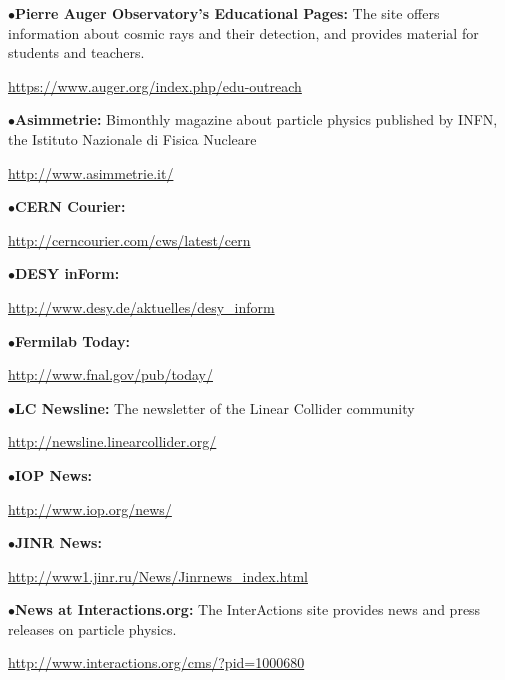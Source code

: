 \smallskip

\item{$\bullet$}{\bf Pierre Auger Observatory's Educational Pages:}
The site offers information about cosmic rays and their detection, and provides material for students and teachers.
     \item{}\qquad\url{https://www.auger.org/index.php/edu-outreach}

\medskip
\medskip



\medskip


\item{$\bullet$}{\bf Asimmetrie:}
Bimonthly magazine about particle physics published by INFN, the Istituto Nazionale di Fisica Nucleare
	\item{}\qquad\url{http://www.asimmetrie.it/}
\medskip

\item{$\bullet$}{\bf CERN Courier:}
	\item{}\qquad\url{http://cerncourier.com/cws/latest/cern}
\medskip

\item{$\bullet$}{\bf DESY inForm:}
	\item{}\qquad\url{http://www.desy.de/aktuelles/desy\_inform}
\medskip

\item{$\bullet$}{\bf Fermilab Today:}
	\item{}\qquad\url{http://www.fnal.gov/pub/today/}
\medskip

\item{$\bullet$}{\bf LC Newsline:}
The newsletter of the Linear Collider community
	\item{}\qquad\url{http://newsline.linearcollider.org/}
	\item{}
\medskip

\item{$\bullet$}{\bf IOP News:}
     \item{}\qquad\url{http://www.iop.org/news/}

\medskip

\item{$\bullet$}{\bf JINR News:}
 \item{}\qquad\url{http://www1.jinr.ru/News/Jinrnews\_index.html}

\medskip

\item{$\bullet$}{\bf News at Interactions.org:}
The InterActions site provides news and press releases on particle physics.
     \item{}\qquad\url{http://www.interactions.org/cms/?pid=1000680}
     \item{}

